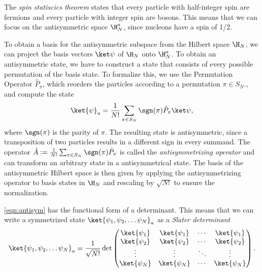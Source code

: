 The \textit{spin statiscics theorem} states that every particle with half-integer spin are fermions and every particle with integer spin are bosons. This means that we can focus on the antisymmetric space $\H_N^a$, since nucleons have a spin of 1/2.

To obtain a basis for the antisymmetric subspace from the Hilbert space $\H_N$, we can project the basis vectors $\ket\psi$ of $\H_N$ onto $\H_N^a$. To obtain an antisymmetric state, we have to construct a state that consists of every possible permutation of the basis state. To formalize this, we use the Permutation Operator $\hat{P}_\pi$, which reorders the particles according to a permutation $\pi \in S_N$., and compute the state
\begin{equation}
  \label{eqn:antisym}
  \ket{\psi}_a = \frac{1}{N!} \sum_{\pi \in S_N} \sgn(\pi) \hat{P}_\pi \ket\psi,
\end{equation}
where $\sgn(\pi)$ is the parity of $\pi$.
The resulting state is antisymmetric, since a transposition of two particles results in a different sign in every summand. The operator $\hat{A} := \frac{1}{N!}\sum_{\pi \in S_N} \sgn(\pi) \hat{P}_\pi$ is called the \textit{antisymmetrizing operator} and can transform an arbitrary state in a antisymmetrical state.
The basis of the antisymmetric Hilbert space is then given by applying the antisymmetrizing operator to basis states in $\H_N$ and rescaling by $\sqrt{N!}$ to ensure the normalization.

\eqref{eqn:antisym} has the functional form of a determinant. This means that we can write a symmetrized state $\ket{\psi_1, \psi_2,  \dots \psi_N}_a$ as a \textit{Slater determinant}
\begin{equation}
  \ket{\psi_1, \psi_2,  \dots \psi_N}_a = \frac{1}{\sqrt{N!}}\det
  \begin{pmatrix}
    \ket{\psi_1} & \ket{\psi_1} & \cdots & \ket{\psi_1} \\
    \ket{\psi_2} & \ket{\psi_2} & \cdots & \ket{\psi_2} \\
    \vdots       & \vdots       & \ddots & \vdots       \\
    \ket{\psi_N} & \ket{\psi_N} & \cdots & \ket{\psi_N} \\
  \end{pmatrix}.
\end{equation}
